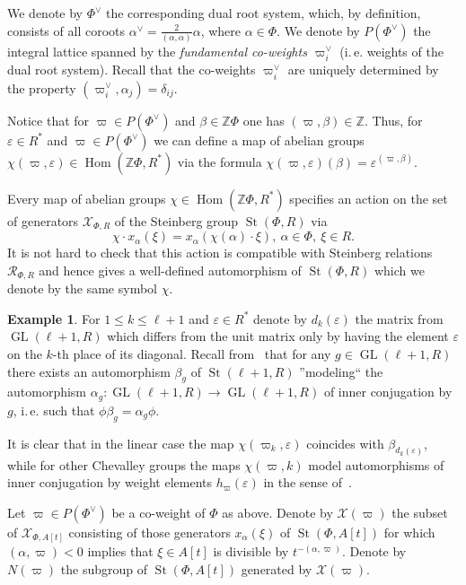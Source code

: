 \documentclass[oneside, 10pt]{amsart}
\DeclareMathOperator{\St}{St}
\DeclareMathOperator{\Hom}{Hom}
\DeclareMathOperator{\GL}{GL}
\newcommand{\ZZ}{\mathbb{Z}}
\newcommand{\XX}{\mathcal{X}}           %
\newcommand{\RR}[1]{\mathcal{R}_{#1}}   %
\numberwithin{equation}{section}
\numberwithin{lemma}{section}
\theoremstyle{definition}
\newtheorem{example}[lemma]{Example}
\theoremstyle{remark}
\begin{document}
We denote by $\Phi^\vee$ the corresponding dual root system, which, by definition, consists of all coroots 
 $\alpha^\vee = \frac{2}{(\alpha, \alpha)} \alpha$, where $\alpha \in \Phi$.
We denote by $P(\Phi^\vee)$ the integral lattice spanned by the \emph{fundamental co-weights $\varpi^\vee_i$} (i.\,e. weights of the dual root system).
Recall that the co-weights $\varpi^\vee_i$ are uniquely determined by the property $(\varpi_i^\vee, \alpha_j) = \delta_{ij}$.

Notice that for $\varpi \in P(\Phi^\vee)$ and $\beta \in \ZZ \Phi$ one has $(\varpi, \beta) \in \ZZ $.
Thus, for $\varepsilon \in R^*$ and $\varpi \in P(\Phi^\vee)$ we can define a map of abelian groups $\chi(\varpi, \varepsilon) \in \Hom(\ZZ \Phi, R^*)$
 via the formula $\chi(\varpi, \varepsilon)(\beta) = \varepsilon ^ {(\varpi, \beta)}$.

Every map of abelian groups $\chi \in \Hom(\ZZ \Phi, R^*)$ specifies an action on the set of generators $\XX_{\Phi, R}$ of the Steinberg group $\St(\Phi, R)$ via
\begin{equation} \chi \cdot x_\alpha(\xi) = x_\alpha(\chi(\alpha) \cdot \xi),\ \alpha\in \Phi,\ \xi \in R. \end{equation}
It is not hard to check that this action is compatible with Steinberg relations $\RR{\Phi, R}$ and 
 hence gives a well-defined automorphism of $\St(\Phi, R)$ which we denote by the same symbol $\chi$.
 
\begin{example}
For $1\leq k\leq \ell+1$ and $\varepsilon \in R^*$ denote by $d_k(\varepsilon)$ the matrix from $\GL(\ell+1, R)$ which differs from the unit matrix 
 only by having the element $\varepsilon$ on the $k$-th place of its diagonal.
Recall from~\cite[Corollary~4]{Ka77} that for any $g \in \GL(\ell+1, R)$ there exists an automorphism $\beta_g$ of $\St(\ell+1, R)$ 
 ''modeling`` the automorphism $\alpha_g \colon \GL(\ell+1, R) \to \GL(\ell+1, R)$ of inner conjugation by $g$, i.\,e. such that $\phi \beta_g = \alpha_g \phi$.

It is clear that in the linear case the map $\chi(\varpi_k, \varepsilon)$ coincides with $\beta_{d_k(\varepsilon)}$, 
 while for other Chevalley groups the maps $\chi(\varpi, k)$ model automorphisms of inner conjugation by weight elements $h_\varpi(\varepsilon)$
  in the sense of~\cite[\S~4]{Vav09}.
\end{example}

Let $\varpi \in P(\Phi^\vee)$ be a co-weight of $\Phi$ as above.
Denote by $\XX(\varpi)$ the subset of $\XX_{\Phi, A[t]}$ consisting of those generators $x_{\alpha}(\xi)$ of $\St(\Phi, A[t])$ for which 
$(\alpha, \varpi) < 0$ implies that $\xi \in A[t]$ is divisible by $t^{-(\alpha, \varpi)}$. Denote by $N(\varpi)$ the subgroup of $\St(\Phi, A[t])$ generated by $\XX(\varpi)$.
\end{document}
